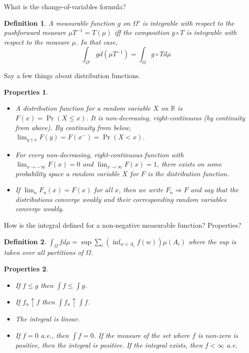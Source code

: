 \documentclass[avery5388,grid,frame]{flashcards}
\newcommand{\R}{\mathbb{R}}
\newtheorem*{definition}{Definition}
\newtheorem*{properties}{Properties}
\begin{document}
\begin{flashcard}
    {What is the change-of-variables formula?}
    \begin{definition}
        A measurable function $g$ on $\Omega'$ is integrable with respect to the pushforward measure $\mu T^{-1} = T(\mu)$ iff the composition $g \circ T$ is integrable with respect to the measure $\mu$. In that case,
        $$\int_{\Omega'} g d(\mu T^{-1}) = \int_{\Omega} g \circ T d\mu$$
    \end{definition}
\end{flashcard}


\begin{flashcard}
    {Say a few things about distribution functions.}
    \begin{properties}
        \begin{itemize}
            \item A distribution function for a random variable $X$ on $\R$ is $F(x) = \Pr(X \leq x)$. It is non-decreasing, right-continuous (by continuity from above). By continuity from below, $\lim_{y \uparrow x} F(y) = F(x^-) = \Pr(X < x)$.
            \item For every non-decreasing, right-continuous function with $\lim_{x \rightarrow -\infty} F(x) = 0$ and $\lim_{x \rightarrow \infty} F(x) = 1$, there exists on some probability space a random variable $X$ for $F$ is the distribution function.
            \item If $\lim_n F_n(x) = F(x)$ for all $x$, then we write $F_n \Rightarrow F$ and say that the distributions converge weakly and their corresponding random variables converge weakly.
        \end{itemize}
    \end{properties}
\end{flashcard}


\begin{flashcard}
    {How is the integral defined for a non-negative measurable function? Properties?}
    \begin{definition}
        $\int_\Omega f d\mu = \sup \sum_i (\inf_{w \in A_i} f(w)) \mu(A_i)$ where the sup is taken over all partitions of $\Omega$.
    \end{definition}

    \begin{properties}
        \begin{itemize}
            \item If $f \leq g$ then $\int f \leq \int g$.
            \item If $f_n \uparrow f$ then $\int f_n \uparrow \int f$.
            \item The integral is linear.
            \item If $f = 0$ a.e., then $\int f = 0$. If the measure of the set where $f$ is non-zero is positive, then the integral is positive. If the integral exists, then $f < \infty$ a.e.
        \end{itemize}
    \end{properties}
\end{flashcard}
\end{document}
